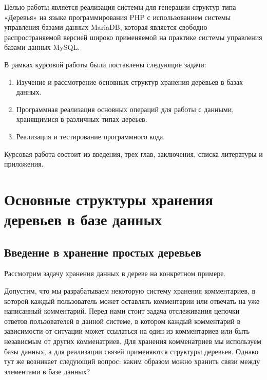\documentclass[a4paper,14pt]{extreport}
\theoremstyle{definition}
\begin{document}
Целью работы является реализация системы для генерации структур типа «Деревья» на языке программирования PHP\cite{PHP,Zandstra} с использованием системы управления базами данных MariaDB, которая является свободно распространяемой версией широко применяемой на практике системы управления базами данных MySQL\cite{MySQL,Schwartz}.

В рамках курсовой работы были поставлены следующие задачи:
\begin{enumerate}
\item Изучение и рассмотрение основных структур хранения деревьев в базах данных.
\item Программная реализация основных операций для работы с данными, хранящимися в различных типах дереьев.
\item Реализация и тестирование программного кода.
\end{enumerate}

Курсовая работа состоит из введения, трех глав, заключения, списка литературы и
приложения.

\chapter{Основные структуры хранения деревьев в базе данных}
\section{Введение в хранение простых деревьев}
Рассмотрим задачу хранения данных в дереве на конкретном примере.

Допустим, что мы разрабатываем некоторую систему хранения комментариев, в которой каждый пользователь может оставлять комментарии или отвечать на уже написанный комментарий. Перед нами стоит задача отслеживания цепочки ответов пользователей в данной системе, в котором каждый комментарий в зависимости от ситуации может ссылаться на один из комментариев или быть независмым от других комменатриев. Для хранения комменатриев мы используем базы данных, а для реализации связей применяются структуры деревьев. Однако тут же возникает следующий вопрос: каким образом можно хранить связи между элементами в базе данных?
\end{document}
